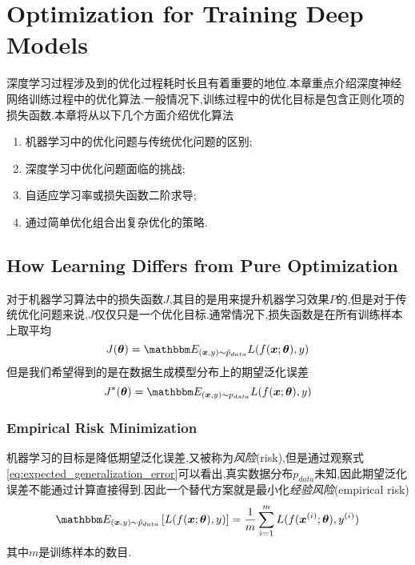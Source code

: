 \chapter{Optimization for Training Deep Models}

深度学习过程涉及到的优化过程耗时长且有着重要的地位.本章重点介绍深度神经网络训练过程中的优化算法.一般情况下,训练过程中的优化目标是包含正则化项的损失函数.本章将从以下几个方面介绍优化算法
\begin{enumerate}
    \item 机器学习中的优化问题与传统优化问题的区别;
    \item 深度学习中优化问题面临的挑战;
    \item 自适应学习率或损失函数二阶求导;
    \item 通过简单优化组合出复杂优化的策略.
\end{enumerate}

\section{How Learning Differs from Pure Optimization}

对于机器学习算法中的损失函数$J$,其目的是用来提升机器学习效果$P$的,但是对于传统优化问题来说,$J$仅仅只是一个优化目标.通常情况下,损失函数是在所有训练样本上取平均
\begin{equation}
J(\bm\theta)=\mathbbm E_{(\bm x,y)\sim\hat p_{data}}L(f(\bm x;\bm\theta),y)
\end{equation}
但是我们希望得到的是在数据生成模型分布上的期望泛化误差
\begin{equation}\label{eq:expected_generalization_error}
J^\ast(\bm\theta)=\mathbbm E_{(\bm x,y)\sim p_{data}}L(f(\bm x;\bm\theta),y)
\end{equation}

\subsection{Empirical Risk Minimization}

机器学习的目标是降低期望泛化误差,又被称为\textit{风险}(risk),但是通过观察式\ref{eq:expected_generalization_error}可以看出,真实数据分布$p_{data}$未知,因此期望泛化误差不能通过计算直接得到.因此一个替代方案就是最小化\textit{经验风险}(empirical risk)
\begin{equation}
\mathbbm E_{(\bm x,y)\sim\hat p_{data}}\left[L(f(\bm x;\bm\theta),y)\right]=\frac{1}{m}\sum_{i=1}^mL(f(\bm x^{(i)};\bm\theta),y^{(i)})
\end{equation}
其中$m$是训练样本的数目.

